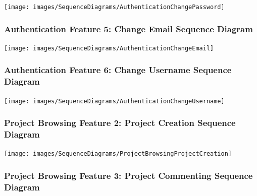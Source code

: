 \documentclass[twoside,letterpaper]{article}
\begin{document}
	\texttt{[image: images/SequenceDiagrams/AuthenticationChangePassword]}
	
	
	\newpage
	
	
	\subsubsection[Authentication Feature 5: Change Email Sequence Diagram]{\rmfamily\bfseries\color{black}
		Authentication Feature 5: Change Email Sequence Diagram}
	\hypertarget{RefHeading22059017292}{}
	\label{a:sd5}
	\bigskip
	
	\texttt{[image: images/SequenceDiagrams/AuthenticationChangeEmail]}
	
	\newpage
	
	
	\subsubsection[Authentication Feature 6: Change Username Sequence Diagram]{\rmfamily\bfseries\color{black}
		Authentication Feature 6: Change Username Sequence Diagram}
		\label{a:sd6}
	\hypertarget{RefHeading22059017292}{}
	
	\bigskip
	
	\texttt{[image: images/SequenceDiagrams/AuthenticationChangeUsername]}
	
	\newpage
	
	
	\subsubsection[Project Browsing Feature 2: Project Creation Sequence Diagram]{\rmfamily\bfseries\color{black}
		Project Browsing Feature 2: Project Creation Sequence Diagram}
	\hypertarget{RefHeading22059017292}{}
	
	\bigskip
	
	\texttt{[image: images/SequenceDiagrams/ProjectBrowsingProjectCreation]}
	
	\newpage
	
	
	\subsubsection[Project Browsing Feature 3: Project Commenting Sequence Diagram]{\rmfamily\bfseries\color{black}
		Project Browsing Feature 3: Project Commenting Sequence Diagram}
	\hypertarget{RefHeading22059017292}{}
	
	\bigskip
	
\end{document}
